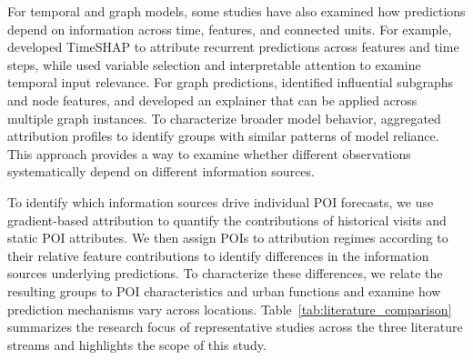 \documentclass[preprint,authoryear,11pt]{elsarticle}
\theoremstyle{definition}
\begin{document}
For temporal and graph models, some studies have also examined how predictions depend on information across time, features, and connected units.
For example, \citet{bento2021timeshap} developed TimeSHAP to attribute recurrent predictions across features and time steps, while \citet{lim2021temporal} used variable selection and interpretable attention to examine temporal input relevance.
For graph predictions, \citet{ying2019gnnexplainer} identified influential subgraphs and node features, and \citet{luo2020parameterized} developed an explainer that can be applied across multiple graph instances.
To characterize broader model behavior, \citet{lundberg2020local} aggregated attribution profiles to identify groups with similar patterns of model reliance.
This approach provides a way to examine whether different observations systematically depend on different information sources.

To identify which information sources drive individual POI forecasts, we use gradient-based attribution to quantify the contributions of historical visits and static POI attributes.
We then assign POIs to attribution regimes according to their relative feature contributions to identify differences in the information sources underlying predictions.
To characterize these differences, we relate the resulting groups to POI characteristics and urban functions and examine how prediction mechanisms vary across locations.
Table~\ref{tab:literature_comparison} summarizes the research focus of representative studies across the three literature streams and highlights the scope of this study.
\end{document}
